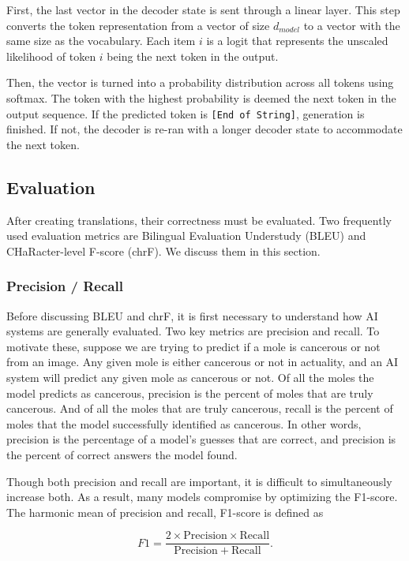 First, the last vector in the decoder state is sent through a linear layer. This step converts the token representation from a vector of size $d_{model}$ to a vector with the same size as the vocabulary. Each item $i$ is a logit that represents the unscaled likelihood of token $i$ being the next token in the output. 

Then, the vector is turned into a probability distribution across all tokens using softmax. The token with the highest probability is deemed the next token in the output sequence. If the predicted token is \texttt{[End of String]}, generation is finished. If not, the decoder is re-ran with a longer decoder state to accommodate the next token.

\subsection{Evaluation}
After creating translations, their correctness must be evaluated. Two frequently used evaluation metrics are Bilingual Evaluation Understudy (BLEU) and CHaRacter-level F-score (chrF). We discuss them in this section.

\subsubsection{Precision / Recall}
Before discussing BLEU and chrF, it is first necessary to understand how AI systems are generally evaluated. Two key metrics are precision and recall. To motivate these, suppose we are trying to predict if a mole is cancerous or not from an image. Any given mole is either cancerous or not in actuality, and an AI system will predict any given mole as cancerous or not. Of all the moles the model predicts as cancerous, precision is the percent of moles that are truly cancerous. And of all the moles that are truly cancerous, recall is the percent of moles that the model successfully identified as cancerous. In other words, precision is the percentage of a model’s guesses that are correct, and precision is the percent of correct answers the model found.

Though both precision and recall are important, it is difficult to simultaneously increase both. As a result, many models compromise by optimizing the F1-score. The harmonic mean of precision and recall, F1-score is defined as 

\[
F1 = \frac{2 \times \mathrm{Precision} \times \mathrm{Recall}}{\mathrm{Precision} + \mathrm{Recall}}.
\]

